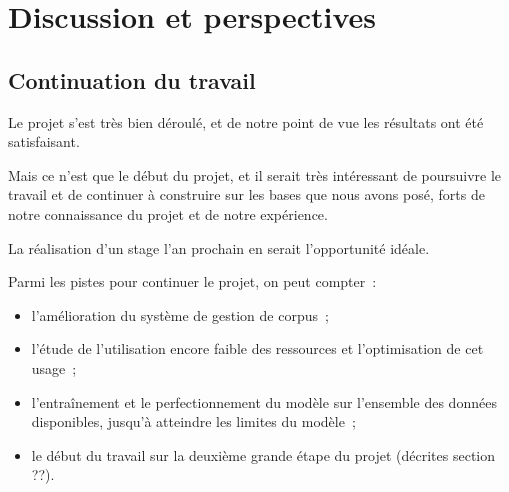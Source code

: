 \section{Discussion et perspectives}
\subsection{Continuation du travail}
Le projet s'est très bien déroulé, et de notre point de vue les résultats ont été satisfaisant.

Mais ce n'est que le début du projet, et il serait très intéressant de poursuivre le travail et de continuer à construire sur les bases que nous avons posé, forts de notre connaissance du projet et de notre expérience.

La réalisation d'un stage l'an prochain en serait l'opportunité idéale.

Parmi les pistes pour continuer le projet, on peut compter~:
\begin{itemize}
	\item l'amélioration du système de gestion de corpus~;
	\item l'étude de l'utilisation encore faible des ressources et l'optimisation de cet usage~;
	\item l'entraînement et le perfectionnement du modèle sur l'ensemble des données disponibles, jusqu'à atteindre les limites du modèle~;
	\item le début du travail sur la deuxième grande étape du projet (décrites section ??).
\end{itemize}
